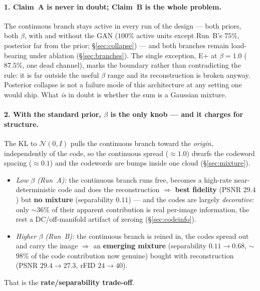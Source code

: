 \documentclass[11pt]{article}
\begin{document}
\paragraph{1. Claim~A is never in doubt; Claim~B is the whole problem.}
The continuous branch stays active in every run of the design --- both priors, both
$\beta$, with and without the GAN ($100\%$ active units except Run~B's $75\%$, posterior far from
the prior; \S\ref{sec:collapse}) --- and both branches remain load-bearing under ablation
(\S\ref{sec:branches}). The single exception, E+ at $\beta{=}1.0$ ($87.5\%$, one dead channel),
marks the boundary rather than contradicting the rule: it is far outside the useful $\beta$ range
and its reconstruction is broken anyway. Posterior collapse is not a failure mode of this
architecture at any setting one would ship. What \emph{is} in doubt is whether the sum is a
Gaussian mixture.

\paragraph{2. With the standard prior, $\beta$ is the only knob --- and it charges for structure.}
The KL to $\mathcal{N}(0,I)$ pulls the continuous branch toward the \emph{origin}, independently of
the code, so the continuous spread ($\approx1.0$) dwarfs the codeword spacing ($\approx0.1$) and the
codewords are bumps inside one cloud (\S\ref{sec:mixture}).
\begin{itemize}
  \item \emph{Low $\beta$ (Run~A):} the continuous branch runs free, becomes a high-rate
  near-deterministic code and does the reconstruction $\Rightarrow$ \textbf{best fidelity}
  (PSNR $29.4$) but \textbf{no mixture} (separability $0.11$) --- and the codes are largely
  \emph{decorative}: only $\sim$$36\%$ of their apparent contribution is real per-image
  information, the rest a DC/off-manifold artifact of zeroing (\S\ref{sec:codeinfo}).
  \item \emph{Higher $\beta$ (Run~B):} the continuous branch is reined in, the codes spread out and
  carry the image $\Rightarrow$ an \textbf{emerging mixture} (separability $0.11\!\to\!0.68$,
  $\sim$$98\%$ of the code contribution now genuine) bought with reconstruction
  (PSNR $29.4\!\to\!27.3$, rFID $24\!\to\!40$).
\end{itemize}
That is the \textbf{rate/separability trade-off}.
\end{document}
